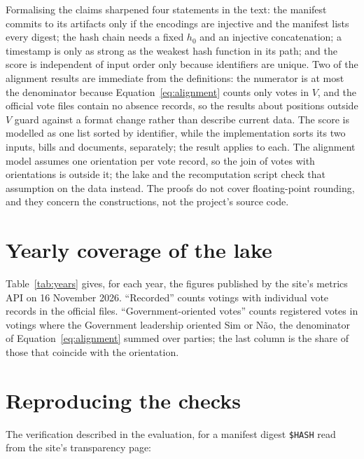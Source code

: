 \documentclass[11pt,a4paper]{article}
\begin{document}
Formalising the claims sharpened four statements in the text: the manifest commits to its artifacts only if the encodings are injective and the manifest lists every digest; the hash chain needs a fixed $h_0$ and an injective concatenation; a timestamp is only as strong as the weakest hash function in its path; and the score is independent of input order only because identifiers are unique. Two of the alignment results are immediate from the definitions: the numerator is at most the denominator because Equation~\ref{eq:alignment} counts only votes in $V$, and the official vote files contain no absence records, so the results about positions outside $V$ guard against a format change rather than describe current data. The score is modelled as one list sorted by identifier, while the implementation sorts its two inputs, bills and documents, separately; the result applies to each. The alignment model assumes one orientation per vote record, so the join of votes with orientations is outside it; the lake and the recomputation script check that assumption on the data instead. The proofs do not cover floating-point rounding, and they concern the constructions, not the project's source code.

\section{Yearly coverage of the lake}
\label{app:years}

Table~\ref{tab:years} gives, for each year, the figures published by the site's metrics API on 16 November 2026. ``Recorded'' counts votings with individual vote records in the official files. ``Government-oriented votes'' counts registered votes in votings where the Government leadership oriented Sim or N\~ao, the denominator of Equation~\ref{eq:alignment} summed over parties; the last column is the share of those that coincide with the orientation.

\begin{table}[ht]
\centering
\small

\caption{Coverage by year. The year 2026 is partial.}
\label{tab:years}
\end{table}

\section{Reproducing the checks}
\label{app:repro}

The verification described in the evaluation, for a manifest digest \texttt{\$HASH} read from the site's transparency page:
\end{document}
